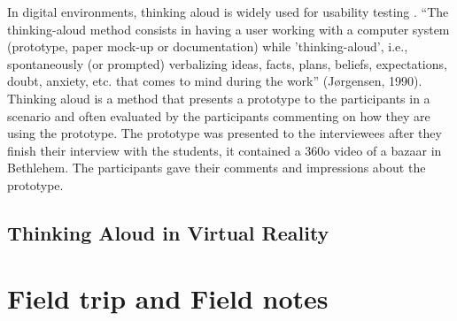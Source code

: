 In digital environments, thinking aloud is widely used for usability testing \citep{VanWaes2000}. “The thinking-aloud method consists in having a user working with a computer system (prototype, paper mock-up or documentation) while 'thinking-aloud', i.e., spontaneously (or prompted) verbalizing ideas, facts, plans, beliefs, expectations, doubt, anxiety, etc. that comes to mind during the work” (Jørgensen, 1990). Thinking aloud is a method that presents a prototype to the participants in a scenario and often evaluated by the participants commenting on how they are using the prototype. The prototype was presented to the interviewees after they finish their interview with the students, it contained a 360o video of a bazaar in Bethlehem. The participants gave their comments and impressions about the prototype.


\subsection{Thinking Aloud in Virtual Reality}

 
\section{Field trip and Field notes}



